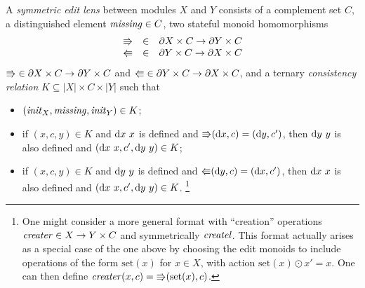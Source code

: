 \begin{definition}
A \emph{symmetric edit lens} between modules $X$ and $Y$ consists of a
complement set $C$, a distinguished element $\mathit{missing}\in C$,
two stateful monoid homomorphisms
\iffull
\[
\begin{array}{lcl}
\mathord{\Rrightarrow} &\in& \partial X \times C \to \partial Y \times C \\
\mathord{\Lleftarrow} &\in& \partial Y \times C \to \partial X \times C
\end{array}
\]
\else
$\mathord{\Rrightarrow} \in \partial X \times C \to \partial Y \times C$ and
$\mathord{\Lleftarrow} \in \partial Y \times C \to \partial X \times C$,
\fi
%
and a ternary {\em consistency relation}
$K\subseteq |X|\times C\times |Y|$ such that
\begin{itemize}
\item $(\mathit{init}_X,\mathit{missing},\mathit{init}_Y)\in K$;
\item if $(x,c,y)\in K$ and $\textrm{d} x\ x$ is defined and $\mathord{\Rrightarrow}(\textrm{d} x,c)=(\textrm{d} y,c')$, then $\textrm{d} y\ y$ is also defined and $(\textrm{d} x\ x,c',\textrm{d} y\ y)\in K$;
\item if $(x,c,y)\in K$ and $\textrm{d} y\ y$ is defined and $\mathord{\Lleftarrow}(\textrm{d} y,c)=(\textrm{d} x,c')$, then $\textrm{d} x\ x$ is also defined and $(\textrm{d} x\ x,c',\textrm{d} y\ y)\in K$.%
%
\iffull
\footnote{One might consider a more general format with ``creation''
  operations $\mathit{creater}\in X\rightarrow Y\times C$ and symmetrically
  $\mathit{createl}$.  This format actually arises as a special case of the one
  above by choosing the edit monoids to include operations of the form
  $\text{set}(x)$ for $x\in X$, with action $\text{set}(x)\odot x'=x$. One
  can then define $\mathit{creater}(x,c) = \mathord{\Rrightarrow}(\text{set}(x),c)$.}
\fi
%
\end{itemize}
\end{definition}

